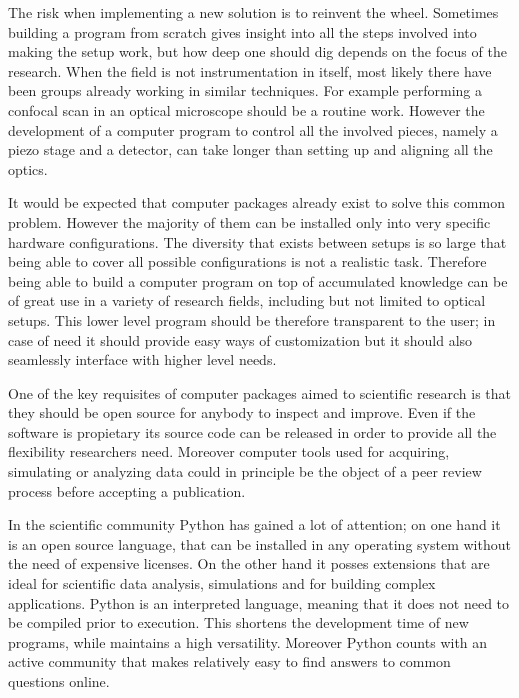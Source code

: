 The risk when implementing a new solution is to reinvent the wheel. Sometimes
building a program from scratch gives insight into all the steps involved into
making the setup work, but how deep one should dig depends on the focus of the
research. When the field is not instrumentation in itself, most likely there
have been groups already working in similar techniques. For example performing a
confocal scan in an optical microscope should be a routine work. However the
development of a computer program to control all the involved pieces, namely a
piezo stage and a detector, can take longer than setting up and aligning all the
optics. 

It would be expected that computer packages already exist to solve this common
problem. However the majority of them can be installed only into very specific
hardware configurations. The diversity that exists between setups is so large
that being able to cover all possible configurations is not a realistic task.
Therefore being able to build a computer program on top of accumulated knowledge
can be of great use in a variety of research fields, including but not limited
to optical setups. This lower level program should be therefore transparent to
the user; in case of need it should provide easy ways of customization but it
should also seamlessly interface with higher level needs. 

One of the key requisites of computer packages aimed to scientific research is
that they should be open source for anybody to inspect and improve. Even if
the software is propietary its source code can be released in order to provide
all the flexibility researchers need. Moreover computer tools used for
acquiring, simulating or analyzing data could in principle be the object of a
peer review process before accepting a publication. 

In the scientific community Python has gained a lot of attention; on one hand it
is an open source language, that can be installed in any operating system
without the need of expensive licenses. On the other hand it posses extensions
that are ideal for scientific data analysis, simulations and for building
complex applications. Python is an interpreted language, meaning that it does
not need to be compiled prior to execution. This shortens the development time
of new programs, while maintains a high versatility. Moreover Python counts
with an active community that makes relatively easy to find answers to common
questions online.

